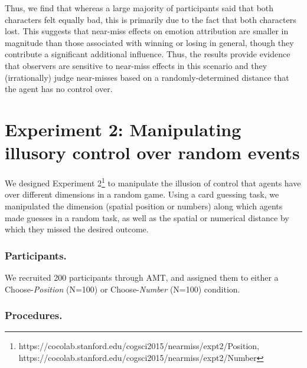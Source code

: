 \documentclass[10pt,letterpaper]{article}
\begin{document}
	Thus, we find that whereas a large majority of participants said that both characters felt equally bad, this is primarily due to the fact that both characters lost. This suggests that near-miss effects on emotion attribution are smaller in magnitude than those associated with winning or losing in general, though they contribute a significant additional influence. 
Thus, the results provide evidence that observers are sensitive to near-miss effects in this scenario and they (irrationally) judge near-misses based on a randomly-determined distance that the agent has no control over.





\section{Experiment 2: Manipulating illusory control over random events}


We designed Experiment 2\footnote{https://cocolab.stanford.edu/cogsci2015/nearmiss/expt2/Position, https://cocolab.stanford.edu/cogsci2015/nearmiss/expt2/Number} to manipulate the illusion of control that agents have over different dimensions in a random game. Using a card guessing task, we manipulated the dimension (spatial position or numbers) along which agents made guesses in a random task, as well as the spatial or numerical distance by which they missed the desired outcome.  


\subsubsection{Participants.} We recruited 200 participants through AMT, and assigned them to either a Choose-\textit{Position} (N=100) or Choose-\textit{Number} (N=100) condition.



\subsubsection{Procedures.} 
\end{document}
